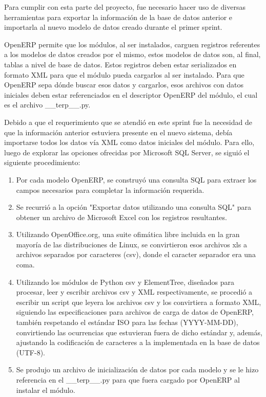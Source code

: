 \documentclass[a4paper, 12pt]{article}
\begin{document}
Para cumplir con esta parte del proyecto, fue necesario hacer uso de diversas herramientas para exportar la información de la base de datos anterior e importarla al nuevo modelo de datos creado durante el primer sprint.

OpenERP permite que los módulos, al ser instalados, carguen registros referentes a los modelos de datos creados por el mismo, estos modelos de datos son, al final, tablas a nivel de base de datos. Estos registros deben estar serializados en formato XML para que el módulo pueda cargarlos al ser instalado. Para que OpenERP sepa dónde buscar esos datos y cargarlos, esos archivos con datos iniciales deben estar referenciados en el descriptor OpenERP del módulo, el cual es el archivo \_\_terp\_\_.py.

Debido a que el requerimiento que se atendió en este sprint fue la necesidad de que la información anterior estuviera presente en el nuevo sistema, debía importarse todos los datos vía XML como datos iniciales del módulo. Para ello, luego de explorar las opciones ofrecidas por Microsoft SQL Server, se siguió el siguiente procedimiento:

\begin{enumerate}
    \item Por cada modelo OpenERP, se construyó una consulta SQL para extraer los campos necesarios para completar la información requerida.
    \item Se recurrió a la opción "Exportar datos utilizando una consulta SQL" para obtener un archivo de Microsoft Excel con los registros resultantes.
    \item Utilizando OpenOffice.org, una suite ofimática libre incluida en la gran mayoría de las distribuciones de Linux, se convirtieron esos archivos xls a archivos separados por caracteres (csv), donde el caracter separador era una coma.
    \item Utilizando los módulos de Python csv y ElementTree, diseñados para procesar, leer y escribir archivos csv y XML respectivamente, se procedió a escribir un script que leyera los archivos csv y los convirtiera a formato XML, siguiendo las especificaciones para archivos de carga de datos de OpenERP, también respetando el estándar ISO para las fechas (YYYY-MM-DD), convirtiendo las ocurrencias que estuvieran fuera de dicho estándar y, además, ajustando la codificación de caracteres a la implementada en la base de datos (UTF-8).
    \item Se produjo un archivo de inicialización de datos por cada modelo y se le hizo referencia en el \_\_terp\_\_.py para que fuera cargado por OpenERP al instalar el módulo.
\end{enumerate}
\end{document}
